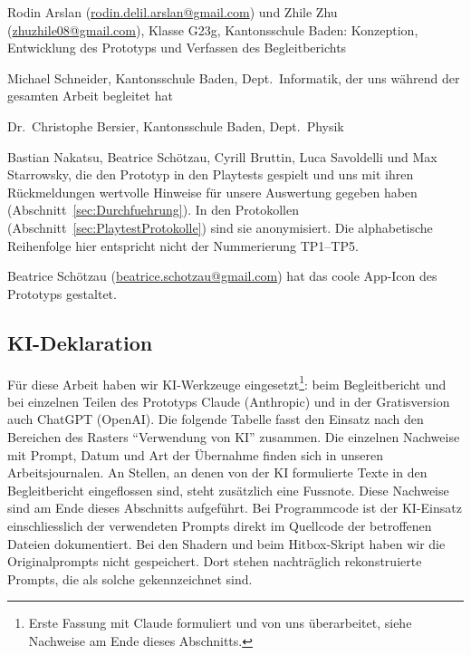 \documentclass[../Main.tex]{subfiles}
\begin{document}
\begin{description}[leftmargin=1.5cm, style=nextline, itemsep=0.6em]
    \item[Projektteam] Rodin Arslan (\url{rodin.delil.arslan@gmail.com}) und Zhile Zhu (\url{zhuzhile08@gmail.com}), Klasse G23g, Kantonsschule Baden: Konzeption, Entwicklung des Prototyps und Verfassen des Begleitberichts
    \item[Erstbetreuung] Michael Schneider, Kantonsschule Baden, Dept.\ Informatik, der uns während der gesamten Arbeit begleitet hat
    \item[Zweitbewerter] Dr.\ Christophe Bersier, Kantonsschule Baden, Dept.\ Physik
    \item[Testpersonen] Bastian Nakatsu, Beatrice Schötzau, Cyrill Bruttin, Luca Savoldelli und Max Starrowsky, die den Prototyp in den Playtests gespielt und uns mit ihren Rückmeldungen wertvolle Hinweise für unsere Auswertung gegeben haben (Abschnitt~\ref{sec:Durchfuehrung}). In den Protokollen (Abschnitt~\ref{sec:PlaytestProtokolle}) sind sie anonymisiert. Die alphabetische Reihenfolge hier entspricht nicht der Nummerierung TP1--TP5.
    \item[Weitere Unterstützung] Beatrice Schötzau (\url{beatrice.schotzau@gmail.com}) hat das coole App-Icon des Prototyps gestaltet.
\end{description}

\subsection{KI-Deklaration} \label{sec:KIDeklaration}

Für diese Arbeit haben wir KI-Werkzeuge eingesetzt\footnote{Erste Fassung mit Claude formuliert und von uns überarbeitet, siehe Nachweise am Ende dieses Abschnitts.}: beim Begleitbericht und bei einzelnen Teilen des Prototyps Claude (Anthropic) und in der Gratisversion auch ChatGPT (OpenAI). Die folgende Tabelle fasst den Einsatz nach den Bereichen des Rasters \enquote{Verwendung von KI} zusammen. Die einzelnen Nachweise mit Prompt, Datum und Art der Übernahme finden sich in unseren Arbeitsjournalen. An Stellen, an denen von der KI formulierte Texte in den Begleitbericht eingeflossen sind, steht zusätzlich eine Fussnote. Diese Nachweise sind am Ende dieses Abschnitts aufgeführt. Bei Programmcode ist der KI-Einsatz einschliesslich der verwendeten Prompts direkt im Quellcode der betroffenen Dateien dokumentiert. Bei den Shadern und beim Hitbox-Skript haben wir die Originalprompts nicht gespeichert. Dort stehen nachträglich rekonstruierte Prompts, die als solche gekennzeichnet sind.
\end{document}
